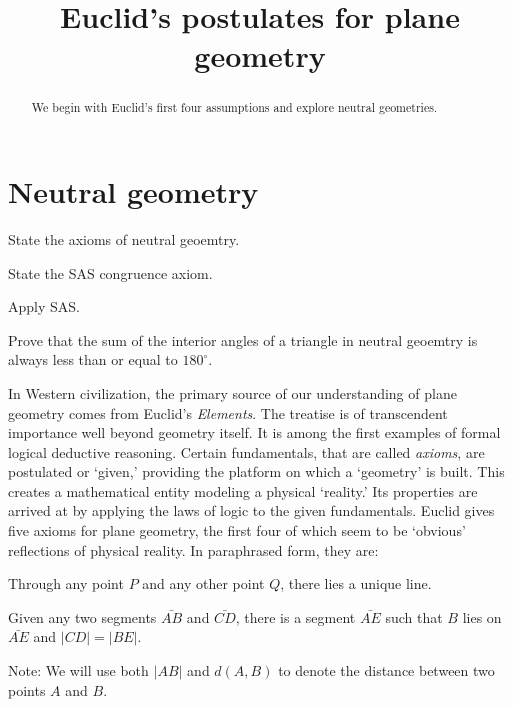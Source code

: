 \documentclass{ximera}
\title{Euclid's postulates for plane geometry} %
\begin{document}
\begin{abstract}
We begin with Euclid's first four assumptions and explore neutral
geometries.
\end{abstract}
\maketitle


\section{Neutral geometry}


\begin{listOutcomes}
\item State the axioms of neutral geoemtry.
\item State the SAS congruence axiom.
\item Apply SAS.
\item Prove that the sum of the interior angles of a triangle in
  neutral geoemtry is always less than or equal to $180^\circ$.
\end{listOutcomes}



In Western civilization, the primary source of our understanding of
plane geometry comes from Euclid's \textit{Elements}. The treatise is
of transcendent importance well beyond geometry itself. It is among
the first examples of formal logical deductive reasoning. Certain
fundamentals, that are called \textit{axioms}, are postulated or
`given,' providing the platform on which a `geometry' is built. This
creates a mathematical entity modeling a physical `reality.' Its
properties are arrived at by applying the laws of logic to the given
fundamentals. Euclid gives five axioms for plane geometry, the first
four of which seem to be `obvious' reflections of physical reality. In
paraphrased form, they are:

\begin{axiom}[E1]
Through any point $P$ and any other point $Q$, there lies a unique
line.
\end{axiom}

\begin{axiom}[E2] 
Given any two segments $\bar{AB}$ and $\bar{CD}$, there is a
segment $\bar{AE}$ such that $B$ lies on $\bar{AE}$ and
$\left\vert CD\right\vert =\left\vert BE\right\vert$.

Note: We will use both $\left\vert AB\right\vert$ and $d(A,B)$ to
denote the distance between two points $A$ and $B$.
\end{axiom}
\end{document}
